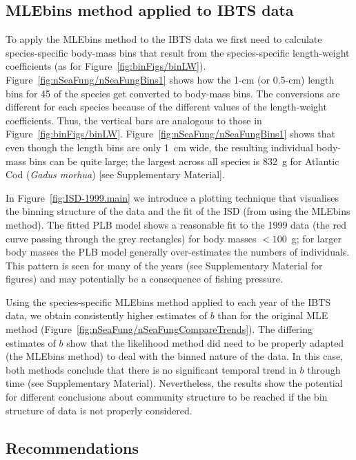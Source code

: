 \documentclass[12pt, letter]{article}
\begin{document}
\subsection{MLEbins method applied to IBTS data}

To apply the MLEbins method to the IBTS data we first need to calculate
species-specific body-mass bins that result from the species-specific
length-weight coefficients (as for Figure~\ref{fig:binFigs/binLW}).
Figure~\ref{fig:nSeaFung/nSeaFungBins1} shows how the 1-cm (or 0.5-cm) length
bins for 45 of the species get converted to body-mass bins. The conversions are
different for each species because of the different values of the length-weight
coefficients. Thus, the vertical bars are analogous to those in
Figure~\ref{fig:binFigs/binLW}. Figure~\ref{fig:nSeaFung/nSeaFungBins1} shows
that even though the length bins are only 1~cm wide, the resulting individual
body-mass bins can be quite large; the largest across all species is 832~g for
Atlantic Cod (\emph{Gadus morhua}) [see Supplementary Material].

In Figure~\ref{fig:ISD-1999.main} we introduce a plotting technique
that visualises the binning structure of the data and the fit of the ISD
(from using the MLEbins method).
The fitted PLB model shows
a reasonable fit to the 1999 data (the red curve passing through the grey
rectangles) for body masses $<100$~g; for larger body masses the PLB model
generally over-estimates the numbers of individuals. This pattern is seen for
many of the years (see Supplementary Material for figures)
and may potentially be a consequence of fishing pressure.


Using the species-specific MLEbins method applied to each year of the IBTS data, we obtain
consistently higher estimates of $b$ than for the original MLE method
(Figure~\ref{fig:nSeaFung/nSeaFungCompareTrends}).
The differing estimates of $b$ show that the likelihood method did need to be
properly adapted (the MLEbins method) to deal with the binned nature of the
data.
In this case, both methods conclude that there is no significant temporal trend
in $b$ through time (see Supplementary Material). Nevertheless, the results show
the potential for different conclusions about community structure to be reached
if the bin structure of data is not properly considered.

\subsection{Recommendations}
\end{document}
